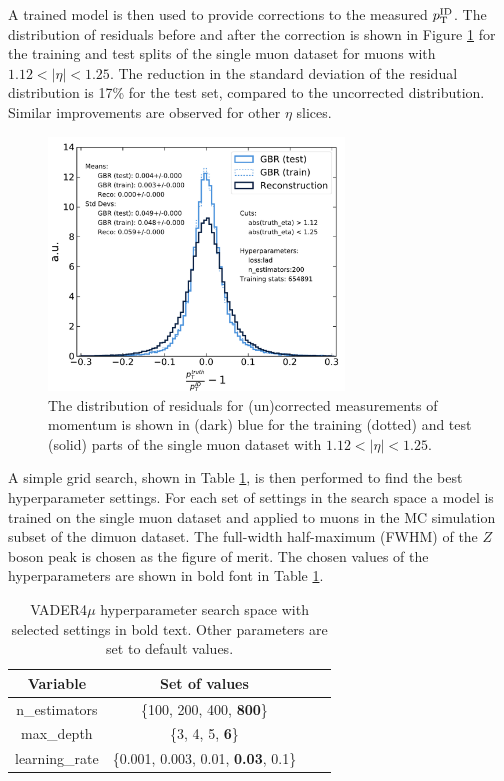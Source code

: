 A trained model is then used to provide corrections to the
measured $p_{\text{T}}^\text{ID}$. The distribution of residuals before and
after the correction is shown in Figure \ref{fig:muon:vader-single}
for the training and test splits of the single muon dataset for muons
with $1.12 < |\eta| < 1.25$. The reduction in the standard deviation
of the residual distribution is 17\% for the test set, compared to
the uncorrected distribution. Similar improvements are observed for
other $\eta$ slices.
\begin{figure}[h!]
  \centering
  \includegraphics[width=0.7\textwidth]{figures/muons/vader-single}
  \caption[VADER4$\mu$ correction on the single muon dataset.]
  {The distribution of residuals for (un)corrected measurements of
  momentum is shown in (dark) blue for the training (dotted)
  and test (solid) parts of the single muon dataset with
  $1.12 < |\eta| < 1.25$.}
  \label{fig:muon:vader-single}
\end{figure}
A simple grid search, shown in Table \ref{tab:muon:grid}, is then
performed to find the best hyperparameter settings. For each 
set of settings in the search space a 
model is trained on the single muon dataset and applied to muons
in the MC simulation subset of the dimuon dataset. The full-width
half-maximum (FWHM) of the $Z$ boson peak is chosen as the figure of
merit. The chosen values of the hyperparameters are shown in bold
font in Table \ref{tab:muon:grid}.
\begin{table}[h]
\centering
\caption{VADER4$\mu$ hyperparameter search space with selected settings
in bold text. Other parameters are set to default values.}
\label{tab:muon:grid}
\begin{tabular}{c c c c }
\toprule
Variable & Set of values \\
\midrule
n\_estimators & \{100, 200, 400, \textbf{800}\} \\
max\_depth & \{3, 4, 5, \textbf{6}\} \\
learning\_rate& \{0.001, 0.003, 0.01, \textbf{0.03}, 0.1\} \\
\bottomrule
\end{tabular}
\end{table}
